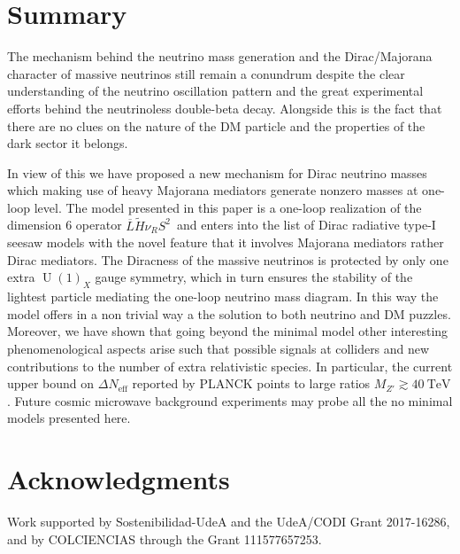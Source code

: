 \documentclass[12pt]{article}
\begin{document}
\section{Summary}
The mechanism behind the neutrino mass generation and the Dirac/Majorana character of massive neutrinos still remain a conundrum despite the clear understanding of the neutrino oscillation pattern and the great experimental efforts behind the neutrinoless double-beta decay. Alongside this is the fact that there are no clues on the nature of the DM particle and the properties of the dark sector it belongs. 

In view of this we have proposed a new mechanism for Dirac neutrino masses which making use of heavy Majorana mediators generate nonzero masses at one-loop level. 
The model presented in this paper is a one-loop realization of the dimension 6 operator $\overline{L} \tilde{H} \nu_R S^2\,$ and enters into the list of Dirac radiative type-I seesaw models with the novel feature that it involves Majorana mediators rather Dirac mediators. 
The Diracness of the massive neutrinos is protected by only one extra $\operatorname{U}(1)_X$ gauge symmetry, which in turn ensures the stability of the lightest particle mediating the one-loop neutrino mass diagram. 
In this way the model offers in a non trivial way a the solution to both neutrino and DM puzzles.
Moreover, we have shown that going beyond the minimal model other interesting phenomenological aspects arise such that possible signals at colliders and new contributions to the number of extra relativistic species. In particular, the  current upper bound on $\Delta N_{\text{eff}}$ reported by PLANCK points to large ratios $M_{Z'}\gtrsim 40\ \text{TeV}$. Future cosmic microwave background experiments may probe all the no minimal models presented here. 

  
\section*{Acknowledgments}
Work supported by Sostenibilidad-UdeA and the UdeA/CODI Grant 2017-16286, and by COLCIENCIAS through the Grant 111577657253. 
\appendix
\end{document}
